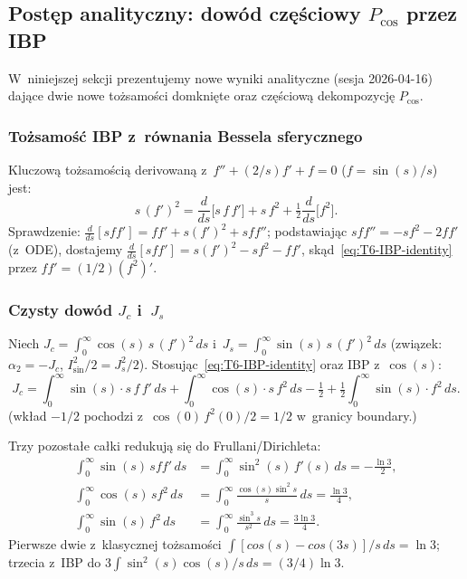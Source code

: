 \subsection{Post\k{e}p analityczny: dow\'od cz\k{e}\'sciowy $P_{\cos}$ przez IBP}
\label{sec:T6-IBP}

W~niniejszej sekcji prezentujemy nowe wyniki analityczne (sesja 2026-04-16)
daj\k{a}ce dwie nowe to\.zsamo\'sci domkni\k{e}te oraz cz\k{e}\'sciow\k{a} dekompozycj\k{e}
$P_{\cos}$.

\subsubsection*{To\.zsamo\'s\'c IBP z~r\'ownania Bessela sferycznego}

Kluczow\k{a} to\.zsamo\'sci\k{a} derivowan\k{a} z~$f'' + (2/s)f' + f = 0$ ($f = \sin(s)/s$) jest:
\begin{equation}
  \boxed{\;s\,(f')^2 = \frac{d}{ds}\big[s\,f\,f'\big] + s\,f^2 + \tfrac{1}{2}\frac{d}{ds}\big[f^2\big].\;}
  \label{eq:T6-IBP-identity}
\end{equation}
Sprawdzenie: $\frac{d}{ds}[s f f'] = f f' + s (f')^2 + s f f''$;
podstawiaj\k{a}c $s f f'' = -s f^2 - 2 f f'$ (z~ODE), dostajemy
$\frac{d}{ds}[s f f'] = s (f')^2 - s f^2 - f f'$, sk\k{a}d~\eqref{eq:T6-IBP-identity}
przez $f f' = (1/2)(f^2)'$.

\subsubsection*{Czysty dow\'od $J_c$ i~$J_s$}

Niech $J_c = \int_0^\infty \cos(s)\,s\,(f')^2\,ds$ i~$J_s = \int_0^\infty \sin(s)\,s\,(f')^2\,ds$
(zwi\k{a}zek: $\alpha_2 = -J_c$, $I_{\sin}^2/2 = J_s^2/2$). Stosuj\k{a}c~\eqref{eq:T6-IBP-identity}
oraz IBP z~$\cos(s)$:
\begin{equation}
  J_c = \int_0^\infty \sin(s)\cdot s\,f\,f'\,ds + \int_0^\infty \cos(s)\cdot s\,f^2\,ds
        - \tfrac{1}{2} + \tfrac{1}{2}\int_0^\infty \sin(s)\cdot f^2\,ds.
\end{equation}
(wk\l{}ad $-1/2$ pochodzi z~$\cos(0)\,f^2(0)/2 = 1/2$ w~granicy boundary.)

Trzy pozosta\l{}e ca\l{}ki redukuj\k{a} si\k{e} do Frullani/Dirichleta:
\begin{align}
  \int_0^\infty \sin(s)\,s f f'\,ds &= \int_0^\infty \sin^2(s)\,f'(s)\,ds
     = -\tfrac{\ln 3}{2}, \\
  \int_0^\infty \cos(s)\,s f^2\,ds &= \int_0^\infty \tfrac{\cos(s)\sin^2 s}{s}\,ds
     = \tfrac{\ln 3}{4}, \\
  \int_0^\infty \sin(s)\,f^2\,ds &= \int_0^\infty \tfrac{\sin^3 s}{s^2}\,ds
     = \tfrac{3\ln 3}{4}.
\end{align}
Pierwsze dwie z~klasycznej to\.zsamo\'sci $\int [cos(s) - cos(3s)]/s\,ds = \ln 3$;
trzecia z~IBP do $3\int \sin^2(s)\cos(s)/s\,ds = (3/4)\ln 3$.

